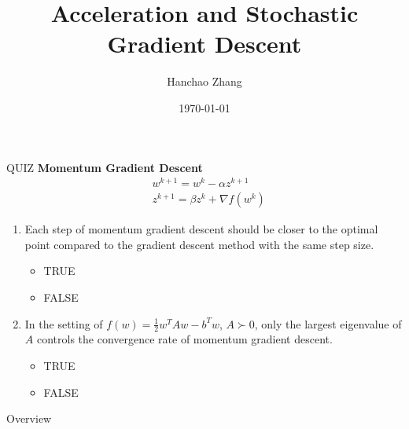 \documentclass[aspectratio=169,xcolor=dvipsnames]{beamer}
\title[short title]{Acceleration and Stochastic Gradient Descent} %
\subtitle{}
\author[Hanchao] {Hanchao Zhang}
\institute[] %
{
}
\date{\today} %
\begin{document}
\begin{frame}
    \titlepage
\end{frame}

\begin{frame}{QUIZ}
\textbf{Momentum Gradient Descent}
\begin{align*}
	&w^{k+1} = w^k - \alpha z^{k+1}\\
	&z^{k+1} = \beta z^k + \nabla f(w^k)
\end{align*}

\begin{enumerate}
	\item Each step of momentum gradient descent should be closer to the optimal point compared to the gradient descent method with the same step size.  \\
	
	\begin{itemize}
		\item TRUE
		\item FALSE
	\end{itemize}

	\item In the setting of $f(w) = \frac{1}{2}w^T A w - b^Tw$, $A \succ 0$, only the largest eigenvalue of $A$ controls the convergence rate of momentum gradient descent.\\
	
	\begin{itemize}
		\item TRUE
		\item FALSE
	\end{itemize}

\end{enumerate}
	
	
\end{frame}

\begin{frame}{Overview}
    \tableofcontents
\end{frame}

\end{document}
